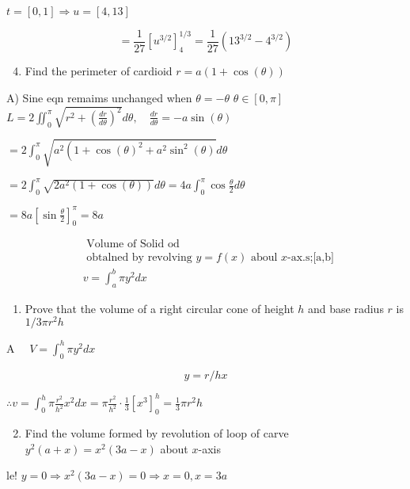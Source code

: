 \documentclass[12pt, a4paper]{article}
\begin{document}
$t=[0,1] \Rightarrow u=[4,13]$

$$
=\frac{1}{27}\left[u^{3 / 2}\right]_{4}^{1 / 3}=\frac{1}{27}\left(13^{3 / 2}-4^{3 / 2}\right)
$$

\begin{enumerate}
  \setcounter{enumi}{3}
  \item Find the perimeter of cardioid $r=a(1+\cos (\theta))$
\end{enumerate}

A) Sine eqn remaims unchanged when $\theta=-\theta$ $\theta \in[0, \pi]$ $L=2 \iint_{0}^{\pi} \sqrt{r^{2}+\left(\frac{d r}{d \theta}\right)^{2}} d \theta, \quad \frac{d r}{d \theta}=-a \sin (\theta)$

$=2 \int_{0}^{\pi} \sqrt{a^{2}\left(1+\cos (\theta)^{2}+a^{2} \sin ^{2}(\theta)\right.} d \theta$

$=2 \int_{0}^{\pi} \sqrt{2 a^{2}(1+\cos (\theta))} d \theta=4 a \int_{0}^{\pi} \cos \frac{\theta}{2} d \theta$

$=8 a\left[\sin \frac{\theta}{2}\right]_{0}^{\pi}=8 a$

$$
\begin{aligned}
& \text { Volume of Solid od } \\
& \text { obtalned by revolving } y=f(x) \text { aboul } x \text {-ax.s;[a,b] } \\
& v=\int_{a}^{b} \pi y^{2} d x
\end{aligned}
$$

\begin{enumerate}
  \item Prove that the volume of a right circular cone of height $h$ and base radius $r$ is $1 / 3 \pi r^{2} h$
\end{enumerate}

A $\quad V=\int_{0}^{h} \pi y^{2} d x$

$$
y=r / h x
$$

$\therefore v=\int_{0}^{h} \pi \frac{r^{2}}{h^{2}} x^{2} d x=\pi \frac{r^{2}}{h^{2}} \cdot \frac{1}{3}\left[x^{3}\right]_{0}^{h}=\frac{1}{3} \pi r^{2} h$

\begin{enumerate}
  \setcounter{enumi}{1}
  \item Find the volume formed by revolution of loop of carve $y^{2}(a+x)=x^{2}(3 a-x)$ about $x$-axis
\end{enumerate}

le! $y=0 \Rightarrow x^{2}(3 a-x)=0 \Rightarrow x=0, x=3 a$
\end{document}
